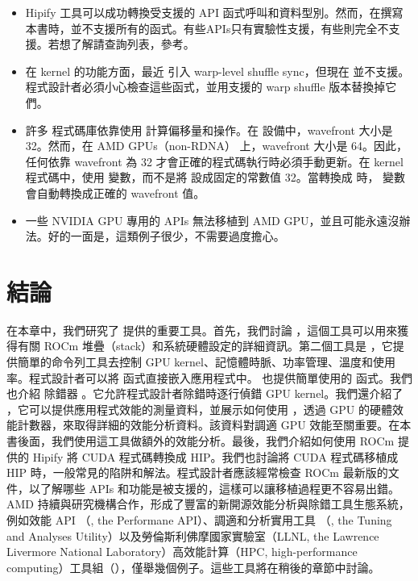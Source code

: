 \begin{itemize}
    \item  Hipify 工具可以成功轉換受支援的  API 函式呼叫和資料型別。然而，在撰寫本書時，並不支援所有的函式。有些APIs只有實驗性支援，有些則完全不支援。若想了解請查詢列表，參考\cite{amd2021hip-supported-api}。
    \item 在 kernel 的功能方面，最近  引入 warp-level shuffle sync，但現在  並不支援。程式設計者必須小心檢查這些函式，並用支援的 warp shuffle 版本替換掉它們。
    \item 許多  程式碼庫依靠使用  計算偏移量和操作。在  設備中，wavefront 大小是 32。然而，在 AMD GPUs（non-RDNA） 上，wavefront 大小是 64。因此，任何依靠 wavefront 為 32 才會正確的程式碼執行時必須手動更新。在  kernel 程式碼中，使用  變數，而不是將  設成固定的常數值 32。當轉換成  時， 變數會自動轉換成正確的 wavefront 值。
    \item 一些 NVIDIA GPU 專用的 APIs 無法移植到 AMD GPU，並且可能永遠沒辦法。好的一面是，這類例子很少，不需要過度擔心。
\end{itemize}

\section{結論}

在本章中，我們研究了  提供的重要工具。首先，我們討論 ，這個工具可以用來獲得有關 ROCm 堆疊（stack）和系統硬體設定的詳細資訊。第二個工具是 ，它提供簡單的命令列工具去控制 GPU kernel、記憶體時脈、功率管理、溫度和使用率。程式設計者可以將  函式直接嵌入應用程式中。 也提供簡單使用的  函式。我們也介紹  除錯器 。它允許程式設計者除錯時逐行偵錯 GPU kernel。我們還介紹了 ，它可以提供應用程式效能的測量資料，並展示如何使用 ，透過 GPU 的硬體效能計數器，來取得詳細的效能分析資料。該資料對調適 GPU 效能至關重要。在本書後面，我們使用這工具做額外的效能分析。最後，我們介紹如何使用 ROCm 提供的 Hipify 將 CUDA 程式碼轉換成 HIP。我們也討論將 CUDA 程式碼移植成 HIP 時，一般常見的陷阱和解法。程式設計者應該經常檢查 ROCm 最新版的文件，以了解哪些 APIs 和功能是被支援的，這樣可以讓移植過程更不容易出錯。AMD 持續與研究機構合作，形成了豐富的新開源效能分析與除錯工具生態系統，例如效能 API （, the Performane API）、調適和分析實用工具 （, the Tuning and Analyses Utility）以及勞倫斯利佛摩國家實驗室（LLNL, the Lawrence Livermore National Laboratory）高效能計算（HPC, high-performance computing）工具組（），僅舉幾個例子。這些工具將在稍後的章節中討論。